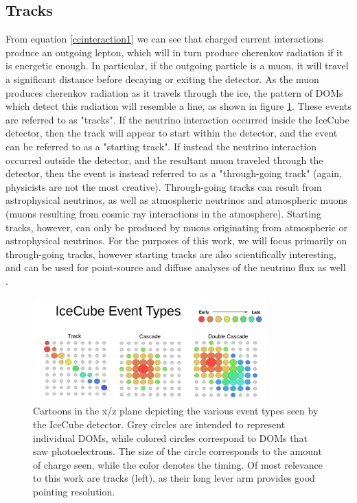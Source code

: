 \subsection{Tracks}
From equation \ref{ccinteraction1} we can see that charged current interactions produce an outgoing lepton, which will in turn produce cherenkov radiation if it is energetic enough. In particular, if the outgoing particle is a muon, it will travel a significant distance before decaying or exiting the detector. As the muon produces cherenkov radiation as it travels through the ice, the pattern of DOMs which detect this radiation will resemble a line, as shown in figure \ref{fig:evttypes}. These events are referred to as "tracks". If the neutrino interaction occurred inside the IceCube detector, then the track will appear to start within the detector, and the event can be referred to as a "starting track". If instead the neutrino interaction occurred outside the detector, and the resultant muon traveled through the detector, then the event is instead referred to as a "through-going track" (again, physicists are not the most creative). Through-going tracks can result from astrophysical neutrinos, as well as atmospheric neutrinos and atmospheric muons (muons resulting from cosmic ray interactions in the atmosphere). Starting tracks, however, can only be produced by muons originating from atmospheric or astrophysical neutrinos. For the purposes of this work, we will focus primarily on through-going tracks, however starting tracks are also scientifically interesting, and can be used for point-source and diffuse analyses of the neutrino flux as well \cite{Estes}.

\begin{figure}[h]
\centering
\includegraphics[width=0.8\textwidth]{figs/evt_types.png}
\caption{Cartoons in the x/z plane depicting the various event types seen by the IceCube detector. Grey circles are intended to represent individual DOMs, while colored circles correspond to DOMs that saw photoelectrons. The size of the circle corresponds to the amount of charge seen, while the color denotes the timing. Of most relevance to this work are tracks (left), as their long lever arm provides good pointing resolution.}
\label{fig:evttypes}
\end{figure}


